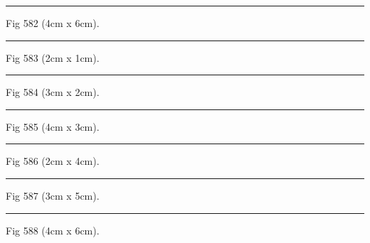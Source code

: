 \documentclass[a4paper,11pt]{article}
\begin{document}
\begin{swarmwrap}%
  \begin{minipage}[t]{4cm}
    \centering
    \rule{\linewidth}{6cm}
    {\footnotesize Fig 582 (4cm x 6cm).}
  \end{minipage}%
\end{swarmwrap}%
\swarmwrapnext
\lipsum[132]%

\begin{swarmwrap}%
  \begin{minipage}[t]{2cm}
    \centering
    \rule{\linewidth}{1cm}
    {\footnotesize Fig 583 (2cm x 1cm).}
  \end{minipage}%
\end{swarmwrap}%
\swarmwrapnext
\lipsum[133]%

\begin{swarmwrap}%
  \begin{minipage}[t]{3cm}
    \centering
    \rule{\linewidth}{2cm}
    {\footnotesize Fig 584 (3cm x 2cm).}
  \end{minipage}%
\end{swarmwrap}%
\swarmwrapnext
\lipsum[134]%

\begin{swarmwrap}%
  \begin{minipage}[t]{4cm}
    \centering
    \rule{\linewidth}{3cm}
    {\footnotesize Fig 585 (4cm x 3cm).}
  \end{minipage}%
\end{swarmwrap}%
\swarmwrapnext
\lipsum[135]%

\begin{swarmwrap}%
  \begin{minipage}[t]{2cm}
    \centering
    \rule{\linewidth}{4cm}
    {\footnotesize Fig 586 (2cm x 4cm).}
  \end{minipage}%
\end{swarmwrap}%
\swarmwrapnext
\lipsum[136]%

\begin{swarmwrap}%
  \begin{minipage}[t]{3cm}
    \centering
    \rule{\linewidth}{5cm}
    {\footnotesize Fig 587 (3cm x 5cm).}
  \end{minipage}%
\end{swarmwrap}%
\swarmwrapnext
\lipsum[137]%

\begin{swarmwrap}%
  \begin{minipage}[t]{4cm}
    \centering
    \rule{\linewidth}{6cm}
    {\footnotesize Fig 588 (4cm x 6cm).}
  \end{minipage}%
\end{swarmwrap}%
\swarmwrapnext
\lipsum[138]%
\end{document}
